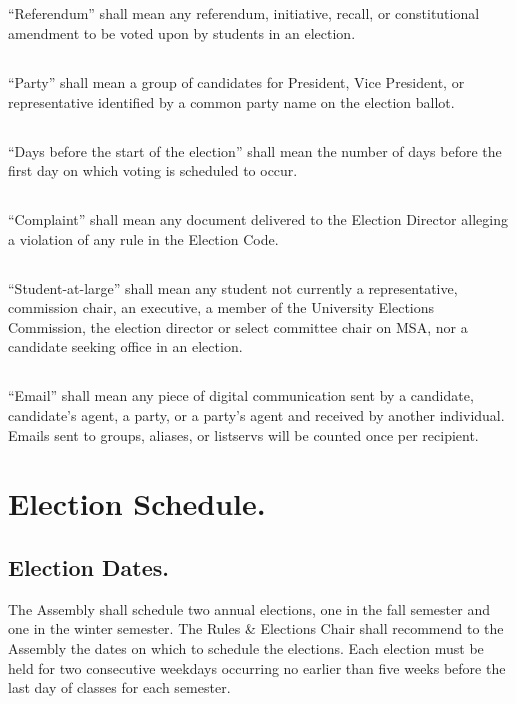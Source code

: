 \subsection{}
``Referendum'' shall mean any referendum, initiative, recall, or constitutional amendment to be voted upon by students in an election.

\subsection{}
``Party'' shall mean a group of candidates for President, Vice President, or representative identified by a common party name on the election ballot.

\subsection{}
``Days before the start of the election'' shall mean the number of days before the first day on which voting is scheduled to occur.

\subsection{}
``Complaint'' shall mean any document delivered to the Election Director alleging a violation of any rule in the Election Code.

\subsection{}
``Student-at-large'' shall mean any student not currently a representative, commission chair, an executive, a member of the University Elections Commission, the election director or select committee chair on MSA, nor a candidate seeking office in an election.

\subsection{}
``Email'' shall mean any piece of digital communication sent by a candidate, candidate's agent, a party, or a party's agent and received by another individual. Emails sent to groups, aliases, or listservs will be counted once per recipient.


\section{Election Schedule.}  

\subsection{Election Dates.}
The Assembly shall schedule two annual elections, one in the fall semester and one in the winter semester.  The Rules \& Elections Chair shall recommend to the Assembly the dates on which to schedule the elections.  Each election must be held for two consecutive weekdays occurring no earlier than five weeks before the last day of classes for each semester.  
